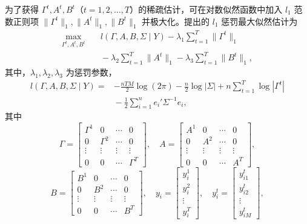为了获得 $\Gamma^t,A^t,B^t$（$t=1,2,\ldots,T$）的稀疏估计，可在对数似然函数中加入 $l_1$ 范数正则项 $\|\Gamma^t\|_1,\|A^t\|_1,\|B^t\|_1$ 并极大化。提出的 $l_1$ 惩罚最大似然估计为
\begin{equation}
\begin{aligned}
\max_{\Gamma^t,A^t,B^t}\quad
 &l(\Gamma,A,B,\Sigma\mid Y)
 -\lambda_1\sum_{t=1}^{T}\|\Gamma^t\|_1\\
 &{}-\lambda_2\sum_{t=1}^{T}\|A^t\|_1
 -\lambda_3\sum_{t=1}^{T}\|B^t\|_1,
\end{aligned}\tag{4.214}
\end{equation}
其中，$\lambda_1,\lambda_2,\lambda_3$ 为惩罚参数，
\[
\begin{aligned}
l(\Gamma,A,B,\Sigma\mid Y)
={}&-\frac{nTM}{2}\log(2\pi)-\frac n2\log|\Sigma|
 +n\sum_{t=1}^{T}\log|\Gamma^t|\\
 &{}-\frac12\sum_{i=1}^{n}e_i'\Sigma^{-1}e_i,
\end{aligned}
\]
其中
\[
\Gamma=\begin{bmatrix}\Gamma^1&0&\cdots&0\\0&\Gamma^2&\cdots&0\\\vdots&\vdots&\vdots&\vdots\\0&0&\cdots&\Gamma^T\end{bmatrix},\quad
A=\begin{bmatrix}A^1&0&\cdots&0\\0&A^2&\cdots&0\\\vdots&\vdots&\vdots&\vdots\\0&0&\cdots&A^T\end{bmatrix},
\]
\[
B=\begin{bmatrix}B^1&0&\cdots&0\\0&B^2&\cdots&0\\\vdots&\vdots&\vdots&\vdots\\0&0&\cdots&B^T\end{bmatrix},\quad
y_i=\begin{bmatrix}y_i^1\\y_i^2\\\vdots\\y_i^T\end{bmatrix},\quad
y_i^t=\begin{bmatrix}y_{i1}^t\\y_{i2}^t\\\vdots\\y_{iM}^t\end{bmatrix},
\]
